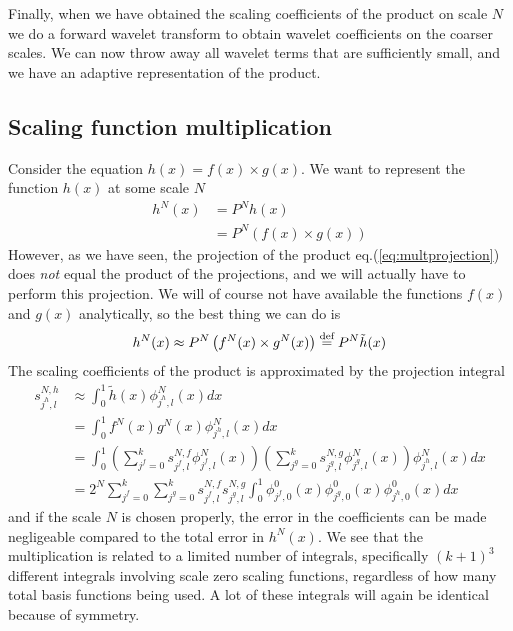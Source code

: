 \noindent
Finally, when we have obtained the scaling coefficients of the product on scale
$N$ we do a forward wavelet transform to obtain wavelet coefficients on 
the coarser scales. We can now throw away all wavelet terms that are
sufficiently small, and we have an adaptive representation of the product.

\subsection*{Scaling function multiplication}
Consider the equation $h(x) = f(x)\times g(x)$. We want to represent the
function $h(x)$ at some scale $N$ 
\begin{align}
	\nonumber
	h^N(x)  &= P^Nh(x)\\
			&= P^N\left(f(x)\times g(x)\right)
	\label{eq:multprojection}
\end{align}
However, as we have seen, the projection of the product
eq.(\ref{eq:multprojection}) does \emph{not} equal the product of the
projections, and we will actually have to perform this projection. We will of
course not have available the functions $f(x)$ and $g(x)$ analytically, so the 
best thing we can do is
\begin{equation}
	h^N(x) \approx P^N\left(f^N(x) \times g^N(x)\right) \stackrel{\text{def}}{\hbox{=}} P^N\tilde{h}(x)
\end{equation}
The scaling coefficients of the product is approximated by the projection 
integral
\begin{align}
	\nonumber
	s^{N,h}_{j^h,l} 
	&\approx \int_0^1	\tilde{h}(x)\phi_{j^h,l}^N(x)dx\\
	\nonumber
	&= \int_0^1 f^N(x)g^N(x)\phi^N_{j^h,l}(x)dx\\
	\nonumber
	&= \int_0^1 
	\left(\sum_{j^f=0}^k s^{N,f}_{j^f,l} \phi^N_{j^f,l}(x)\right)
	\left(\sum_{j^g=0}^k s^{N,g}_{j^g,l} \phi^N_{j^g,l}(x)\right)
	\phi_{j^h,l}^N(x)dx\\
	&= 2^N \sum_{j^f=0}^k\sum_{j^g=0}^k 
	s_{j^f,l}^{N,f} s_{j^g,l}^{N,g} \int_0^1 
	\phi_{j^f,0}^0(x)\phi_{j^g,0}^0(x)\phi_{j^h,0}^0(x)dx
	\label{eq:multexpansion}
\end{align}
and if the scale $N$ is chosen properly, the error in the coefficients can
be made negligeable compared to the total error in $h^N(x)$. We see that the
multiplication is related to a limited number of integrals, specifically 
$(k+1)^3$ different integrals involving scale zero scaling functions, 
regardless of how many total basis functions being used. A lot of these 
integrals will again be identical because of symmetry.

